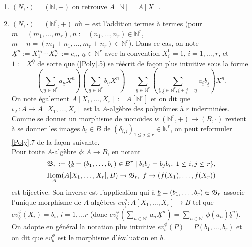 \documentclass[a4paper, oneside, 12pt]{book}
\theoremstyle{theoremeStyle} %
\theoremstyle{definition} %
\DeclareMathOperator{\SHom}{Hom}
\newcommand{\N}{\mathbb{N}}
\begin{document}
  \begin{enumerate}[leftmargin=* ,parsep=0cm,itemsep=0cm,topsep=0cm]
 \item  $(N,\cdot)=(\N,+)$ on retrouve $A[\N]=A[X]$.\\
 \item $(N,\cdot)=(\N^r,+)$ où $+$ est l'addition termes à termes (pour $\underline{m}=(m_1,\dots,m_r), \underline{n}:=(n_1,\dots, n_r)\in \N^r$,   $\underline{m}+\underline{n}=(m_1+n_1,\dots,m_r+n_r)\in \N^r$). Dans ce cas, on note $\underline{X}^{\underline{n}}:=X_1^{n_1}\cdots X_r^{n_r}:=e_{\underline{n}}$, $\underline{n}\in \N^r$ avec la convention $X_i^0=1$, $i=1,\dots, r$,  et $1:=\underline{X}^{\underline{0}}$ de sorte que (\ref{Poly}.5) se réécrit de fa\c{c}on plus intuitive sous la forme
 $$ (\sum_{\underline{n}\in\N^r}a_{\underline{n}}\underline{X}^{\underline{n}}) (\sum_{\underline{n}\in \N^r}b_{\underline{n}}\underline{X}^{\underline{n}})=\sum_{\underline{n}\in \N^r}(\sum_{\underline{i},\underline{j}\in \N^r, \underline{i}+\underline{j}=\underline{n}}a_{\underline{i}}b_{\underline{j}})\underline{X}^{\underline{n}}.$$
On note également $A[X_1,\dots, X_r]:=A[\N^r]$ et on dit que $\iota_A:A\rightarrow A[X_1,\dots, X_r]$ est la $A$-algèbre des polynômes à $r$ inderminées. Comme se donner un morphisme de monoïdes $\nu:(\N^r,+)\rightarrow (B ,\cdot)$ revient à se donner les images $b_i\in B $ de $(\delta_{i,j})_{1\leq j\leq r}\in \N^r$, on peut reformuler \ref{Poly}.7 de la fa\c{c}on suivante.\\

   Pour toute $A$-algèbre $\phi:A\rightarrow B$, en notant
 $$\frak{B}_r:= \lbrace \underline{b}=(b_1,\dots, b_r)\in B^r\;|\; b_ib_j=b_jb_i,\; 1\leq i,j\leq r\rbrace,$$
$$\SHom_A(A[X_1,\dots,X_r],B)\rightarrow \frak{B}_r,\; f\rightarrow (f(X_1),\dots, f(X_r))$$
 est bijective. Son inverse est l'application qui à $\underline{b}=(b_1,\dots, b_r)\in \frak{B}_r$ associe l'unique morphisme de $A$-algèbres $ev_{\underline{b}}^\phi:A[X_1,\dots, X_r]\rightarrow B$ tel que $ev_{\underline{b}}^\phi(X_i)=b_i$, $i=1,\dots r$ (donc $ev_{\underline{b}}^\phi(\sum_{\underline{n}\in \N^r}a_{\underline{n}}\underline{X}^{\underline{n}})=\sum_{\underline{n}\in \N^r}\phi(a_{\underline{n}})\underline{b}^{\underline{n}}$). On adopte  en général la notation plus intuitive $ev_{\underline{b}}^\phi(P)=P(b_1,\dots, b_r)$ et on dit que $ev_{\underline{b}}^\phi$ est le morphisme d'évaluation en $\underline{b}$.\\



\end{enumerate}
\end{document}
